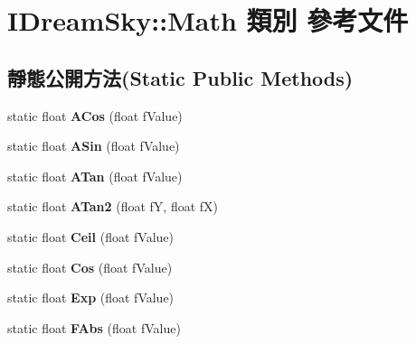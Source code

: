 \hypertarget{class_i_dream_sky_1_1_math}{}\section{I\+Dream\+Sky\+:\+:Math 類別 參考文件}
\label{class_i_dream_sky_1_1_math}
\subsection*{靜態公開方法(Static Public Methods)}
\begin{DoxyCompactItemize}
\item 
static float {\bfseries A\+Cos} (float f\+Value)\hypertarget{class_i_dream_sky_1_1_math_ac75a95c6a742382fb6958035d77dafe2}{}\label{class_i_dream_sky_1_1_math_ac75a95c6a742382fb6958035d77dafe2}

\item 
static float {\bfseries A\+Sin} (float f\+Value)\hypertarget{class_i_dream_sky_1_1_math_a8fcd209a021db5cef9248a478ff42393}{}\label{class_i_dream_sky_1_1_math_a8fcd209a021db5cef9248a478ff42393}

\item 
static float {\bfseries A\+Tan} (float f\+Value)\hypertarget{class_i_dream_sky_1_1_math_a508087f5264205a88de97adb42126372}{}\label{class_i_dream_sky_1_1_math_a508087f5264205a88de97adb42126372}

\item 
static float {\bfseries A\+Tan2} (float fY, float fX)\hypertarget{class_i_dream_sky_1_1_math_a8c41f4748f96220908bdbca30a694210}{}\label{class_i_dream_sky_1_1_math_a8c41f4748f96220908bdbca30a694210}

\item 
static float {\bfseries Ceil} (float f\+Value)\hypertarget{class_i_dream_sky_1_1_math_a6dc3d75831de7e0698bbb0eada95f260}{}\label{class_i_dream_sky_1_1_math_a6dc3d75831de7e0698bbb0eada95f260}

\item 
static float {\bfseries Cos} (float f\+Value)\hypertarget{class_i_dream_sky_1_1_math_a1cb64de79f99208a5a6ec6f18e3ee845}{}\label{class_i_dream_sky_1_1_math_a1cb64de79f99208a5a6ec6f18e3ee845}

\item 
static float {\bfseries Exp} (float f\+Value)\hypertarget{class_i_dream_sky_1_1_math_a46d021a954ec7b946b7b15fc569023af}{}\label{class_i_dream_sky_1_1_math_a46d021a954ec7b946b7b15fc569023af}

\item 
static float {\bfseries F\+Abs} (float f\+Value)\hypertarget{class_i_dream_sky_1_1_math_aa5d14c4582d422bf85bcdd625bbd4fa1}{}\label{class_i_dream_sky_1_1_math_aa5d14c4582d422bf85bcdd625bbd4fa1}


\end{DoxyCompactItemize}
